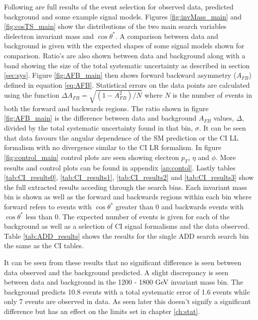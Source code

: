 	Following are full results of the event selection for observed data, predicted background and some example signal models. Figures \ref{fig:invMass_main} and \ref{fig:cosTS_main} show the distributions of the two main search variables dielectron invariant mass and $\cos{\theta^{*}}$. A comparison between data and background is given with the expected shapes of some signal models shown for comparison. Ratio's are also shown between data and background along with a band showing the size of the total systematic uncertainty as described in section \ref{sec:sys}. Figure \ref{fig:AFB_main} then shows forward backward asymmetry ($A_{FB}$) defined in equation \ref{eq:AFB}. Statistical errors on the data points are calculated using the function $\Delta A_{FB} = \sqrt{(1-A_{FB}^{2})/N}$ where $N$ is the number of events in both the forward and backwards regions. The ratio shown in figure \ref{fig:AFB_main} is the difference between data and background $A_{FB}$ values, $\Delta$, divided by the total systematic uncertainty found in that bin, $\sigma$. It can be seen that data favours the angular dependence of the SM prediction or the CI LL formalism with no divergence similar to the CI LR formalism. 
	In figure \ref{fig:control_main} control plots are seen showing electron $p_{T}$, $\eta$ and $\phi$. More results and control plots can be found in appendix \ref{ap:contol}. Lastly tables \ref{tab:CI_results0}, \ref{tab:CI_results1}, \ref{tab:CI_results2} and \ref{tab:CI_results3} show the full extracted results acceding through the search bins. Each invariant mass bin is shown as well as the forward and backwards regions within each bin where forward refers to events with $\cos{\theta^{*}}$ greater than 0 and backwards events with $\cos{\theta^{*}}$ less than 0. The expected number of events is given for each of the background as well as a selection of CI signal formalisms and the data observed. Table \ref{tab:ADD_results} shows the results for the single ADD search search bin the same as the CI tables.

	It can be seen from these results that no significant difference is seen between data observed and the background predicted. A slight discrepancy is seen between data and background in the 1200 - 1800 GeV invariant mass bin. The background predicts 10.8 events with a total systematic error of 1.6 events while only 7 events are observed in data. As seen later this doesn't signify a significant difference but has an effect on the limits set in chapter \ref{ch:stat}. 



